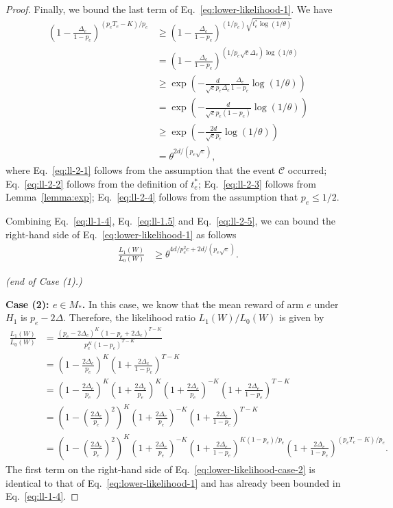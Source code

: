 \documentclass{article}
\begin{document}
\begin{spacing}{1.1}
\begin{proof}
Finally, we bound the last term of Eq.~\eqref{eq:lower-likelihood-1}. 
We have
\begin{align}
\left(1-\frac{\Delta_e}{1-p_e}\right)^{(p_eT_e-K)/p_e} 
& \ge \left(1-\frac{\Delta_e}{1-p_e}\right)^{(1/p_e)\sqrt{t_e^*\log(1/\theta)}} \label{eq:ll-2-1} \\
&  =  \left(1-\frac{\Delta_e}{1-p_e}\right)^{(1/p_e\sqrt{c}\Delta_e)\log(1/\theta)} \label{eq:ll-2-2} \\
& \ge \exp\left(-\frac{d}{\sqrt c p_e \Delta_e}\frac{\Delta_e}{1-p_e}\log(1/\theta)\right) \label{eq:ll-2-3} \\
& = \exp\left(-\frac{d}{\sqrt c p_e (1-p_e)}\log(1/\theta)\right) \nonumber \\
& \ge \exp\left(-\frac{2d}{\sqrt c p_e}\log(1/\theta)\right) \label{eq:ll-2-4} \\
& = \theta^{2d/(p_e\sqrt{c})} \label{eq:ll-2-5},
\end{align}
where Eq.~\eqref{eq:ll-2-1} follows from the assumption that the event $\mathcal C$ occurred;
Eq.~\eqref{eq:ll-2-2} follows from the definition of $t_e^*$;
Eq.~\eqref{eq:ll-2-3} follows from Lemma~\ref{lemma:exp};
Eq.~\eqref{eq:ll-2-4} follows from the assumption that $p_e \le 1/2$.

Combining Eq.~\eqref{eq:ll-1-4}, Eq.~\eqref{eq:ll-1.5} and Eq.~\eqref{eq:ll-2-5}, we can bound the right-hand side of Eq.~\eqref{eq:lower-likelihood-1} as follows
\begin{align}
\label{eq:ll-case1-final}
\frac{L_1(W)}{L_0(W)} &\ge \theta^{4d/p_e^2c+2d/(p_e\sqrt{c})}.
\end{align}

\emph{(end of Case (1).)}

\textbf{Case (2): $e\in M_*$.}
In this case, we know that the mean reward of arm $e$ under $H_1$ is $p_e-2\Delta$.
Therefore, the likelihood ratio $L_1(W)/L_0(W)$ is given by
\begin{align}
  \frac{L_1(W)}{L_0(W)} &= \frac{(p_e-2\Delta_e)^{K} (1-p_e+2\Delta_e)^{T-K}}{p_e^K(1-p_e)^{T-K}} \nonumber \\
  						&=\left(1-\frac{2\Delta_e}{p_e}\right)^K\left(1+\frac{2\Delta_e}{1-p_e}\right)^{T-K} \nonumber\\
  						&=\left(1-\frac{2\Delta_e}{p_e}\right)^K
                          \left(1+\frac{2\Delta_e}{p_e}\right)^K\left(1+\frac{2\Delta_e}{p_e}\right)^{-K}
  						  \left(1+\frac{2\Delta_e}{1-p_e}\right)^{T-K} \nonumber\\
  						&=\left(1-\left(\frac{2\Delta_e}{p_e}\right)^2\right)^K\left(1+\frac{2\Delta_e}{p_e}\right)^{-K}
  						  \left(1+\frac{2\Delta_e}{1-p_e}\right)^{T-K} \nonumber \\
  						&=\left(1-\left(\frac{2\Delta_e}{p_e}\right)^2\right)^K\left(1+\frac{2\Delta_e}{p_e}\right)^{-K}
  						  \left(1+\frac{2\Delta_e}{1-p_e}\right)^{K(1-p_e)/p_e}
  						  \left(1+\frac{2\Delta_e}{1-p_e}\right)^{(p_eT_e-K)/p_e} \label{eq:lower-likelihood-case-2}.
\end{align}
The first term on the right-hand side of Eq.~\eqref{eq:lower-likelihood-case-2} is identical to that of Eq.~\eqref{eq:lower-likelihood-1} and has already been bounded in Eq.~\eqref{eq:ll-1-4}.


\end{proof}
\end{spacing}
\end{document}
